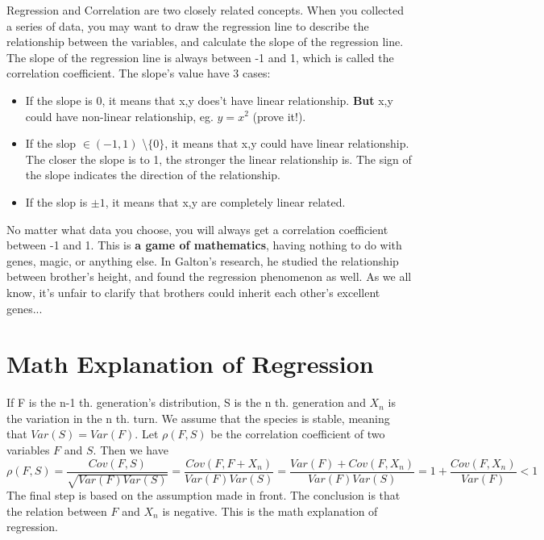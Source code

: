 \documentclass{article}
\begin{document}
Regression and Correlation are two closely related concepts. When you collected a series of data, you may want to draw the regression line to describe the relationship between the variables, and calculate the slope of the regression line. The slope of the regression line is always between -1 and 1, which is called the correlation coefficient. 
The slope's value have 3 cases:
\begin{itemize}
    \item If the slope is 0, it means that x,y does't have linear relationship. \textbf{But} x,y could have non-linear relationship, eg. $y=x^2$ (prove it!).
    \item If the slop $\in (-1,1)$ \textbackslash $\{0\}$, it means that x,y could have linear relationship. The closer the slope is to 1, the stronger the linear relationship is. The sign of the slope indicates the direction of the relationship.
    \item If the slop is $\pm 1$, it means that x,y are completely linear related.
\end{itemize}

\begin{warn}[Notice:]
  No matter what data you choose, you will always get a correlation coefficient between -1 and 1. This is \textbf{a game of mathematics}, having nothing to do with genes, magic, or anything else. In Galton's research, he studied the relationship between brother's height, and found the regression phenomenon as well. As we all know, it's unfair to clarify that brothers could inherit each other's excellent genes... \par 
\end{warn}


\section{Math Explanation of Regression}
If F is the n-1 th. generation's distribution, S is the n th. generation and $X_n$ is the variation in the n th. turn. We assume that the species is stable, meaning that $Var(S)=Var(F)$. Let $\rho (F,S)$ be the correlation coefficient of two variables $F$ and $S$. Then we have 
$$ \rho(F,S)=\frac{Cov(F,S)}{\sqrt{Var(F)Var(S)}} = \frac{Cov(F,F+X_n)}{Var(F)Var(S)}=\frac{Var(F)+Cov(F,X_n)}{Var(F)Var(S)}=1+\frac{Cov(F,X_n)}{Var(F)}<1$$
The final step is based on the assumption made in front. The conclusion is that the relation between $F$ and $X_n$ is negative. This is the math explanation of regression. \par
\end{document}
